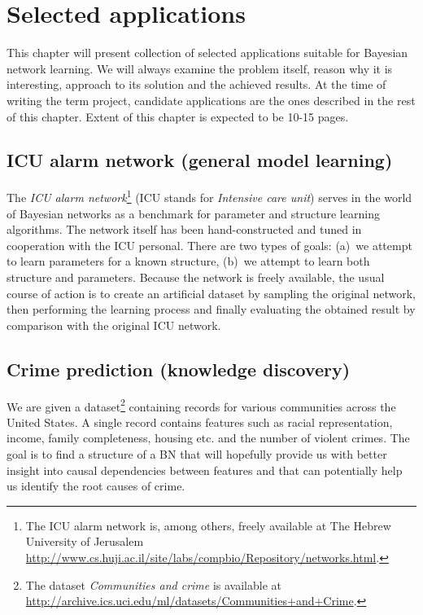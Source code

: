 \documentclass[english,cover]{fitthesis} %
\newcommand{\term}[1]{\emph{#1}}           %
\newcommand{\ignore}[1]{}                  %
\begin{document}
\chapter{Selected applications}
This chapter will present collection of selected applications suitable for Bayesian network learning. We will always examine the problem itself, reason why it is interesting, approach to its solution and the achieved results. At the time of writing the term project, candidate applications are the ones described in the rest of this chapter. Extent of this chapter is expected to be 10-15 pages.

\section{ICU alarm network (general model learning)}
The \term{ICU alarm network}\footnote{The ICU alarm network is, among others, freely available at The Hebrew University of Jerusalem \ignore{\url{http://www.bnlearn.com/bnrepository/}}\url{http://www.cs.huji.ac.il/site/labs/compbio/Repository/networks.html}.} (ICU stands for \term{Intensive care unit}) serves in the world of Bayesian networks as a benchmark for parameter and structure learning algorithms. The network itself has been hand-constructed and tuned in cooperation with the ICU personal. There are two types of goals: (a)~we attempt to learn parameters for a known structure, (b)~we attempt to learn both structure and parameters. Because the network is freely available, the usual course of action is to create an artificial dataset by sampling the original network, then performing the learning process and finally evaluating the obtained result by comparison with the original ICU network. 


\section{Crime prediction (knowledge discovery)}
We are given a dataset\footnote{The dataset \emph{Communities and crime} is available at \url{http://archive.ics.uci.edu/ml/datasets/Communities+and+Crime}.} containing records for various communities across the United States. A single record contains features such as racial representation, income, family completeness, housing etc. and the number of violent crimes. The goal is to find a structure of a BN that will hopefully provide us with better insight into causal dependencies between features and that can potentially help us identify the root causes of crime.
\end{document}
